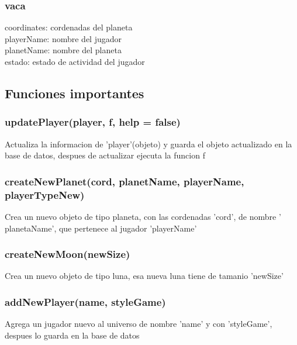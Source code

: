 \documentclass{article}
\newcommand\tab[1][1cm]{\hspace*{#1}}
\begin{document}
          \subsubsection{vaca}
            \tab coordinates: cordenadas del planeta\\
            \tab playerName: nombre del jugador\\
            \tab planetName: nombre del planeta\\
            \tab estado: estado de actividad del jugador\\
    \subsection{Funciones importantes}
        \subsubsection{updatePlayer(player, f, help = false)}
            Actualiza la informacion de 'player'(objeto) y guarda el objeto actualizado en la base de datos, despues de actualizar ejecuta la funcion f
        \subsubsection{createNewPlanet(cord, planetName, playerName, playerTypeNew)}
            Crea un nuevo objeto de tipo planeta, con las cordenadas 'cord', de nombre ' planetaName', que pertenece al jugador 'playerName'
        \subsubsection{createNewMoon(newSize)}
            Crea un nuevo objeto de tipo luna, esa nueva luna tiene de tamanio 'newSize'
        \subsubsection{addNewPlayer(name, styleGame)}
            Agrega un jugador nuevo al universo de nombre 'name' y con 'styleGame', despues lo guarda en la base de datos
\end{document}
